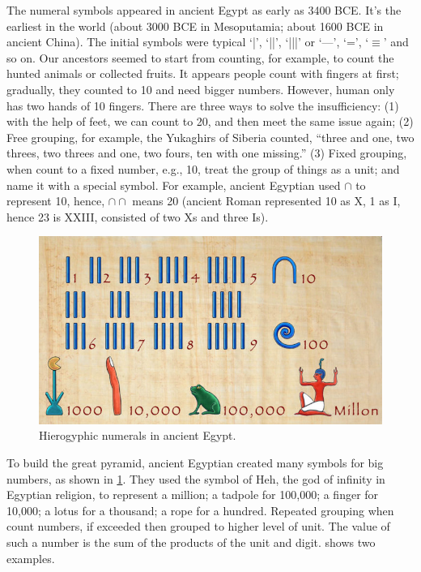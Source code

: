 \documentclass[b5paper]{article}
\begin{document}
The numeral symbols appeared in ancient Egypt as early as 3400 BCE. It's the earliest in the world (about 3000 BCE in Mesoputamia; about 1600 BCE in ancient China\cite{Clawson-1994}). The initial symbols were typical `|', `||', `|||' or `—', `=', `$\equiv$' and so on. Our ancestors seemed to start from counting, for example, to count the hunted animals or collected fruits. It appears people count with fingers at first; gradually, they counted to 10 and need bigger numbers. However, human only has two hands of 10 fingers. There are three ways to solve the insufficiency: (1) with the help of feet, we can count to 20, and then meet the same issue again; (2) Free grouping, for example, the Yukaghirs of Siberia counted, ``three and one, two threes, two threes and one, two fours, ten with one missing.'' (3) Fixed grouping, when count to a fixed number, e.g., 10, treat the group of things as a unit; and name it with a special symbol. For example, ancient Egyptian used $\cap$ to represent 10, hence, $\cap \cap$ means 20 (ancient Roman represented 10 as X, 1 as I, hence 23 is XXIII, consisted of two Xs and three Is).

\begin{figure}[htbp]
 \centering
 \includegraphics[scale=0.8]{img/hieroglyphic-numbers}
 \caption{Hierogyphic numerals in ancient Egypt.}
 \label{fig:egypt-hieroglyphic-numerals}
\end{figure}

To build the great pyramid, ancient Egyptian created many symbols for big numbers, as shown in \cref{fig:egypt-hieroglyphic-numerals}. They used the symbol of Heh, the god of infinity in Egyptian religion, to represent a million; a tadpole for 100,000; a finger for 10,000; a lotus for a thousand; a rope for a hundred. Repeated grouping when count numbers, if exceeded then grouped to higher level of unit. The value of such a number is the sum of the products of the unit and digit.  shows two examples.
\end{document}
